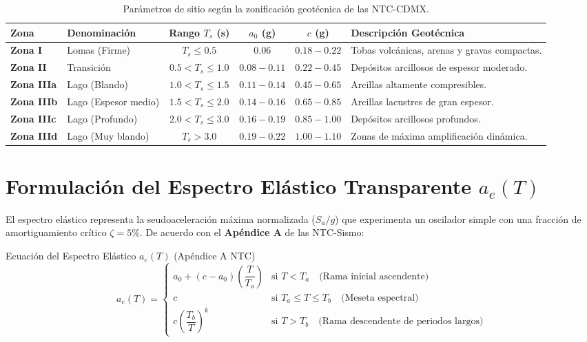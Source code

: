 \documentclass[11pt,a4paper]{article}
\begin{document}
\begin{table}[h!]
\centering
\small
\renewcommand{\arraystretch}{1.25}
\begin{tabular}{@{}llcccl@{}}
\toprule
\textbf{Zona} & \textbf{Denominación} & \textbf{Rango $T_s$ (s)} & \textbf{$a_0$ (g)} & \textbf{$c$ (g)} & \textbf{Descripción Geotécnica} \\
\midrule
\textbf{Zona I}   & Lomas (Firme)         & $T_s \le 0.5$    & $0.06$       & $0.18 - 0.22$ & Tobas volcánicas, arenas y gravas compactas. \\
\textbf{Zona II}  & Transición            & $0.5 < T_s \le 1.0$ & $0.08 - 0.11$ & $0.22 - 0.45$ & Depósitos arcillosos de espesor moderado. \\
\textbf{Zona IIIa}& Lago (Blando)         & $1.0 < T_s \le 1.5$ & $0.11 - 0.14$ & $0.45 - 0.65$ & Arcillas altamente compresibles. \\
\textbf{Zona IIIb}& Lago (Espesor medio)  & $1.5 < T_s \le 2.0$ & $0.14 - 0.16$ & $0.65 - 0.85$ & Arcillas lacustres de gran espesor. \\
\textbf{Zona IIIc}& Lago (Profundo)       & $2.0 < T_s \le 3.0$ & $0.16 - 0.19$ & $0.85 - 1.00$ & Depósitos arcillosos profundos. \\
\textbf{Zona IIId}& Lago (Muy blando)     & $T_s > 3.0$      & $0.19 - 0.22$ & $1.00 - 1.10$ & Zonas de máxima amplificación dinámica. \\
\bottomrule
\end{tabular}
\caption{Parámetros de sitio según la zonificación geotécnica de las NTC-CDMX.}
\end{table}

\vspace{-0.2cm}

\section{Formulación del Espectro Elástico Transparente $a_e(T)$}
El espectro elástico representa la seudoaceleración máxima normalizada ($S_a / g$) que experimenta un oscilador simple con una fracción de amortiguamiento crítico $\zeta = 5\%$. De acuerdo con el \textbf{Apéndice A} de las NTC-Sismo:

\begin{formulabox}{Ecuación del Espectro Elástico $a_e(T)$ (Apéndice A NTC)}
$$
a_e(T) = 
\begin{cases} 
a_0 + (c - a_0) \left(\dfrac{T}{T_a}\right) & \text{si } T < T_a \quad \text{(Rama inicial ascendente)} \\[10pt]
c & \text{si } T_a \le T \le T_b \quad \text{(Meseta espectral)} \\[10pt]
c \left(\dfrac{T_b}{T}\right)^k & \text{si } T > T_b \quad \text{(Rama descendente de periodos largos)}
\end{cases}
$$
\end{formulabox}
\end{document}
